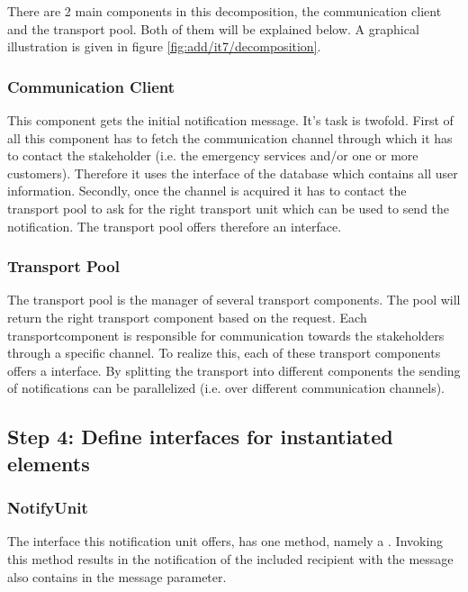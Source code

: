 \npar There are 2 main components in this decomposition, the communication
client and the transport pool. Both of them will be explained below. A graphical
illustration is given in figure \ref{fig:add/it7/decomposition}.

\subsubsection{Communication Client} 
\npar This component gets the initial notification message. It's task is
twofold. First of all this component has to fetch the communication channel
through which it has to contact the stakeholder (i.e. the emergency services
and/or one or more customers). Therefore it uses the 
interface of the database which contains all user information. Secondly, once
the channel is acquired it has to contact the transport pool to ask for the
right transport unit which can be used to send the notification. The transport
pool offers therefore an  interface.

\subsubsection{Transport Pool}

\npar The transport pool is the manager of several transport components. The
pool will return the right transport component based on the request. Each
transportcomponent is responsible for communication towards the stakeholders
through a specific channel. To realize this, each of these transport components
offers a  interface. By splitting the transport into different
components the sending of notifications can be parallelized (i.e. over
different communication channels).

\subsection{Step 4: Define interfaces for instantiated elements}
\label{add:it7/interfaces}

\subsubsection{NotifyUnit}
\npar The interface this notification unit offers, has one method, namely a
. Invoking this method results in the notification of the
included recipient with the message also contains in the message parameter.

